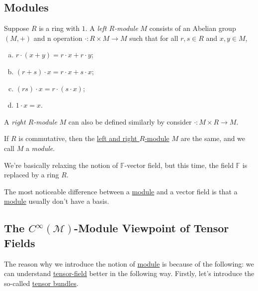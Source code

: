 \subsection{Modules}
\begin{definition}\label{def:left-module}
	Suppose \(R\) is a ring with \(1\). A \emph{left \(R\)-module} \(M\) consists of an Abelian group \((M, +)\) and n operation \(\cdot \colon R \times M \to M\) such that for all \(r, s\in R\) and \(x, y\in M\),
	\begin{enumerate}[(a)]
		\item \(r\cdot (x+y) = r\cdot x + r\cdot y\);
		\item \((r+s)\cdot x = r\cdot x + s\cdot x\);
		\item \((rs)\cdot x = r\cdot (s\cdot x)\);
		\item \(1\cdot x = x\).
	\end{enumerate}
\end{definition}

\begin{note}
	A \emph{right \(R\)-module} \(M\) can also be defined similarly by consider \(\cdot \colon M \times R \to M\).
\end{note}

\begin{definition}[Module]\label{def:module}
	If \(R\) is commutative, then the \hyperref[def:left-module]{left and right \(R\)-module} \(M\) are the same, and we call \(M\) a \emph{module}.
\end{definition}

\begin{intuition}
	We're basically relaxing the notion of \(\mathbb{F} \)-vector field, but this time, the field \(\mathbb{F} \) is replaced by a ring \(R\).
\end{intuition}

\begin{remark}
	The most noticeable difference between a \hyperref[def:module]{module} and a vector field is that a \hyperref[def:module]{module} usually don't have a basis.
\end{remark}

\subsection{The \(C^{\infty} (\mathcal{M} )\)-Module Viewpoint of Tensor Fields}\label{subsection:C-infty-module-viewpoint-of-tensor-fields}
The reason why we introduce the notion of \hyperref[def:module]{module} is because of the following: we can understand \hyperref[def:tensor-field]{tensor-field} better in the following way. Firstly, let's introduce the so-called \hyperref[def:tensor-bundle]{tensor bundles}.

